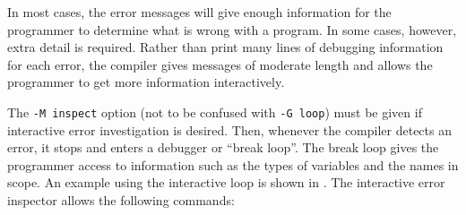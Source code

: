 
In most cases, the error messages will give enough information for
the programmer to determine what is wrong with a program.
In some cases, however, extra detail is required.
Rather than print many lines of debugging information for each error,
the \asharp{} compiler gives messages of moderate length and allows
the programmer to get more information interactively.

The {\tt -M~inspect} option (not to be confused with {\tt -G~loop})
must be given if interactive error investigation is desired.  Then,
whenever the compiler detects an error, it stops and enters
a debugger or ``break loop''.
The break loop gives the programmer access to information such as the
types of variables and the names in scope.
An example using the interactive loop is shown in .
\clearpage
The interactive error inspector allows the following commands:

